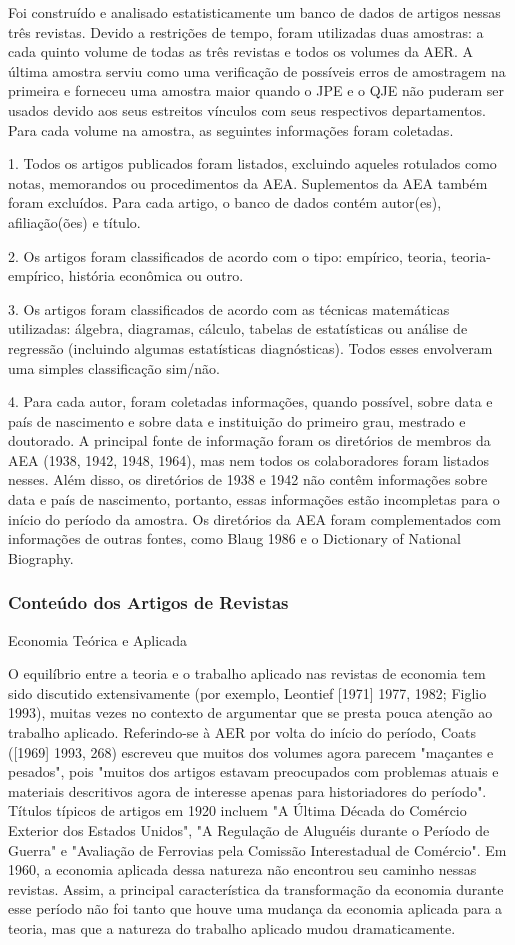 \documentclass[12pt]{article}
\begin{document}
Foi construído e analisado estatisticamente um banco de dados de artigos nessas três revistas. Devido a restrições de tempo, foram utilizadas duas amostras: a cada quinto volume de todas as três revistas e todos os volumes da AER. A última amostra serviu como uma verificação de possíveis erros de amostragem na primeira e forneceu uma amostra maior quando o JPE e o QJE não puderam ser usados devido aos seus estreitos vínculos com seus respectivos departamentos. Para cada volume na amostra, as seguintes informações foram coletadas.

1. Todos os artigos publicados foram listados, excluindo aqueles rotulados como notas, memorandos ou procedimentos da AEA. Suplementos da AEA também foram excluídos. Para cada artigo, o banco de dados contém autor(es), afiliação(ões) e título.

2. Os artigos foram classificados de acordo com o tipo: empírico, teoria, teoria-empírico, história econômica ou outro.

3. Os artigos foram classificados de acordo com as técnicas matemáticas utilizadas: álgebra, diagramas, cálculo, tabelas de estatísticas ou análise de regressão (incluindo algumas estatísticas diagnósticas). Todos esses envolveram uma simples classificação sim/não.

4. Para cada autor, foram coletadas informações, quando possível, sobre data e país de nascimento e sobre data e instituição do primeiro grau, mestrado e doutorado. A principal fonte de informação foram os diretórios de membros da AEA (1938, 1942, 1948, 1964), mas nem todos os colaboradores foram listados nesses. Além disso, os diretórios de 1938 e 1942 não contêm informações sobre data e país de nascimento, portanto, essas informações estão incompletas para o início do período da amostra. Os diretórios da AEA foram complementados com informações de outras fontes, como Blaug 1986 e o Dictionary of National Biography.

\subsubsection{\textbf{Conteúdo dos Artigos de Revistas}}
Economia Teórica e Aplicada

O equilíbrio entre a teoria e o trabalho aplicado nas revistas de economia tem sido discutido extensivamente (por exemplo, Leontief [1971] 1977, 1982; Figlio 1993), muitas vezes no contexto de argumentar que se presta pouca atenção ao trabalho aplicado. Referindo-se à AER por volta do início do período, Coats ([1969] 1993, 268) escreveu que muitos dos volumes agora parecem "maçantes e pesados", pois "muitos dos artigos estavam preocupados com problemas atuais e materiais descritivos agora de interesse apenas para historiadores do período". Títulos típicos de artigos em 1920 incluem "A Última Década do Comércio Exterior dos Estados Unidos", "A Regulação de Aluguéis durante o Período de Guerra" e "Avaliação de Ferrovias pela Comissão Interestadual de Comércio". Em 1960, a economia aplicada dessa natureza não encontrou seu caminho nessas revistas. Assim, a principal característica da transformação da economia durante esse período não foi tanto que houve uma mudança da economia aplicada para a teoria, mas que a natureza do trabalho aplicado mudou dramaticamente.
\end{document}
